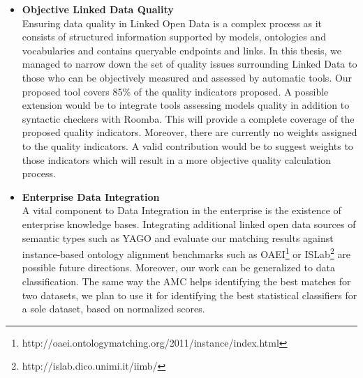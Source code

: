 \begin{itemize}
\item \textbf{Objective Linked Data Quality}
\vspace{1mm}
\\
Ensuring data quality in Linked Open Data is a complex process as it consists of structured information supported by models, ontologies and vocabularies and contains queryable endpoints and links. In this thesis, we managed to narrow down the set of quality issues surrounding Linked Data to those who can be objectively measured and assessed by automatic tools. Our proposed tool covers 85\% of the quality indicators proposed. A possible extension would be to integrate tools assessing models quality in addition to syntactic checkers with Roomba. This will provide a complete coverage of the proposed quality indicators. Moreover, there are currently no weights assigned to the quality indicators. A valid contribution would be to suggest weights to those indicators which will result in a more objective quality calculation process.

\item \textbf{Enterprise Data Integration}
\vspace{1mm}
\\
A vital component to Data Integration in the enterprise is the existence of enterprise knowledge bases. Integrating additional linked open data sources of semantic types such as YAGO and evaluate our matching results against instance-based ontology alignment benchmarks such as OAEI\footnote{http://oaei.ontologymatching.org/2011/instance/index.html} or ISLab\footnote{http://islab.dico.unimi.it/iimb/} are possible future directions. Moreover, our work can be generalized to data classification. The same way the AMC helps identifying the best matches for two datasets, we plan to use it for identifying the best statistical classifiers for a sole dataset, based on normalized scores.
\end{itemize}